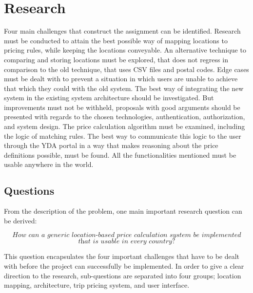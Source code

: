 %
\section{Research}
Four main challenges that construct the assignment can be identified. Research must be conducted to attain the best possible way of mapping locations to pricing rules, while keeping the locations conveyable. An alternative technique to comparing and storing locations must be explored, that does not regress in comparison to the old technique, that uses CSV files and postal codes. Edge cases must be dealt with to prevent a situation in which users are unable to achieve that which they could with the old system. The best way of integrating the new system in the existing system architecture should be investigated. But improvements must not be withheld, proposals with good arguments should be presented with regards to the chosen technologies, authentication, authorization, and system design. The price calculation algorithm must be examined, including the logic of matching rules. The best way to communicate this logic to the user through the YDA portal in a way that makes reasoning about the price definitions possible, must be found. All the functionalities mentioned must be usable anywhere in the world.

\subsection{Questions}
From the description of the problem, one main important research question can be derived:

\[\textit{How can a generic location-based price calculation system be implemented}\]
\[\textit{that is usable in every country?}\] \hfill

This question encapsulates the four important challenges that have to be dealt with before the project can successfully be implemented. In order to give a clear direction to the research, sub-questions are separated into four groups; location mapping, architecture, trip pricing system, and user interface.

